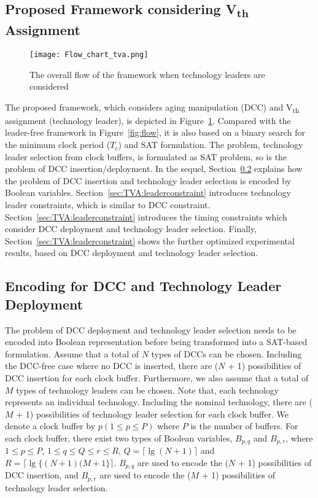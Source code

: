 \subsection{Proposed Framework considering V\textsubscript{th} Assignment}
\label{sec:TVA:framework}
\begin{figure}
	\centering
	\texttt{[image: Flow\_chart\_tva.png]}
	\caption{The overall flow of the framework when technology leaders are considered }
	\label{fig:flow:tva}
\end{figure}
The proposed framework, which considers aging manipulation (DCC) and V\textsubscript{th} assignment (technology leader), is depicted in Figure~\ref{fig:flow:tva}. Compared with the leader-free framework in Figure~\ref{fig:flow}, it is also based on a binary search for the minimum clock period ($T_c$) and SAT formulation. The problem, technology leader selection from clock buffers, is formulated as SAT problem, so is the problem of DCC insertion/deployment. In the sequel, Section~\ref{sec:TVA:leader_encode} explains how the problem of DCC insertion and technology leader selection is encoded by Boolean variables. Section~\ref{sec:TVA:leaderconstraint} introduces technology leader constraints, which is similar to DCC constraint. Section~\ref{sec:TVA:leaderconstraint} introduces the timing constraints which consider DCC deployment and technology leader selection. Finally,  Section~\ref{sec:TVA:leaderconstraint} shows the further optimized experimental results, based on DCC deployment and technology leader selection.

\subsection{Encoding for DCC and Technology Leader Deployment}
\label{sec:TVA:leader_encode}
The problem of DCC deployment and technology leader selection needs to be encoded into Boolean representation before being transformed into a SAT-based formulation. Assume that a total of $N$ types of DCCs can be chosen. Including the DCC-free case where no DCC is inserted, there are ($N$ + 1) possibilities of DCC insertion for each clock buffer. Furthermore, we also assume that a total of $M$ types of technology leaders can be chosen. Note that, each technology represents an individual technology. Including the nominal technology, there are ($M$ + 1) possibilities of technology leader selection for each clock buffer. We denote a clock buffer by $p\left(1 \leq p \leq P\right)$ where $P$ is the number of buffers. For each clock buffer, there exist two types of Boolean variables, $B_{p,q}$ and $B_{p,r}$, where $1 \leq p \leq P$, $1 \leq q \leq Q \leq r \leq R$, $Q = \lceil \lg (N + 1)\rceil$ and $R = \lceil \lg \{(N + 1)(M + 1\}\rceil$. $B_{p,q}$ are used to encode the ($N$ + 1) possibilities of DCC insertion, and $B_{p,r}$ are used to encode the ($M$ + 1) possibilities of technology leader selection.


